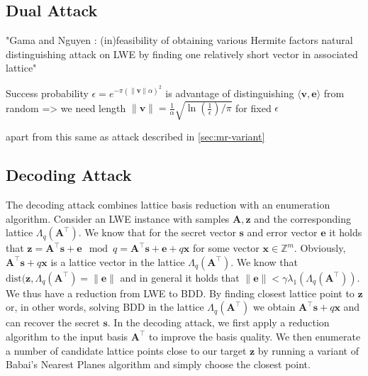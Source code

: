 





\subsection[Dual Attack]{Dual Attack \cite{MR09}} %
"Gama and Nguyen \cite{GN08b}: (in)feasibility of obtaining various Hermite factors
natural distinguishing attack on LWE by finding one relatively short vector in associated lattice"

Success probability $\epsilon = e^{-\pi (\| \mathbf{v}\| \alpha)^2}$ is advantage of distinguishing $\langle \mathbf{v}, \mathbf{e}\rangle$ from random \cite{APS15}
=> we need length $\|\mathbf{v}\| = \frac{1}{\alpha}\sqrt{\ln \left(\frac{1}{\epsilon}\right) / \pi}$ for fixed $\epsilon$

apart from this same as attack described in \cref{sec:mr-variant}




\subsection[Decoding Attack]{Decoding Attack \cite{LP11}} \label{sec:decoding}

The decoding attack combines lattice basis reduction with an enumeration algorithm. Consider an LWE instance with samples $\mathbf{A}, \mathbf{z}$ and the corresponding lattice $\Lambda_q(\mathbf{A}^\intercal)$. We know that for the secret vector $\mathbf{s}$ and error vector $\mathbf{e}$ it holds that $\mathbf{z} = \mathbf{A}^\intercal \mathbf{s} + \mathbf{e} \mod q = \mathbf{A}^\intercal \mathbf{s} + \mathbf{e} + q \mathbf{x}$ for some vector $\mathbf{x} \in \mathbb{Z}^m$. Obviously, $\mathbf{A}^\intercal \mathbf{s} + q \mathbf{x}$ is a lattice vector in the lattice $\Lambda_q(\mathbf{A}^\intercal)$. We know that $\text{dist}(\mathbf{z}, \Lambda_q(\mathbf{A}^\intercal) = \|\mathbf{e}\|$ and in general it holds that $\|\mathbf{e}\| < \gamma \lambda_1(\Lambda_q(\mathbf{A}^\intercal))$. We thus have a reduction from LWE to BDD. By finding closest lattice point to $\mathbf{z}$ or, in other words, solving BDD in the lattice $\Lambda_q(\mathbf{A}^\intercal)$ we obtain $\mathbf{A}^\intercal \mathbf{s} + q \mathbf{x}$  and can recover the secret $\mathbf{s}$. In the decoding attack, we first apply a reduction algorithm to the input basis $\mathbf{A}^\intercal$ to improve the basis quality. We then enumerate a number of candidate lattice points close to our target $\mathbf{z}$ by running a variant of Babai's Nearest Planes algorithm and simply choose the closest point. %

